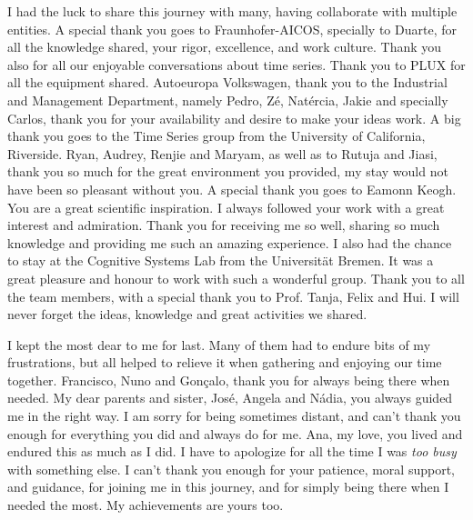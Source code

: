 \begin{ntacknowledgements}
I had the luck to share this journey with many, having collaborate with multiple entities. A special thank you goes to Fraunhofer-AICOS, specially to Duarte, for all the knowledge shared, your rigor, excellence, and work culture. Thank you also for all our enjoyable conversations about time series. Thank you to PLUX for all the equipment shared. Autoeuropa Volkswagen, thank you to the Industrial and Management Department, namely Pedro, Zé, Natércia, Jakie and specially Carlos, thank you for your availability and desire to make your ideas work. A big thank you goes to the Time Series group from the University of California, Riverside. Ryan, Audrey, Renjie and Maryam, as well as to Rutuja and Jiasi, thank you so much for the great environment you provided, my stay would not have been so pleasant without you. A special thank you goes to Eamonn Keogh. You are a great scientific inspiration. I always followed your work with a great interest and admiration. Thank you for receiving me so well, sharing so much knowledge and providing me such an amazing experience. I also had the chance to stay at the Cognitive Systems Lab from the Universität Bremen. It was a great pleasure and honour to work with such a wonderful group. Thank you to all the team members, with a special thank you to Prof. Tanja, Felix and Hui. I will never forget the ideas, knowledge and great activities we shared.

I kept the most dear to me for last. Many of them had to endure bits of my frustrations, but all helped to relieve it when gathering and enjoying our time together. Francisco, Nuno and Gonçalo, thank you for always being there when needed. My dear parents and sister, José, Angela and Nádia, you always guided me in the right way. I am sorry for being sometimes distant, and can't thank you enough for everything you did and always do for me. Ana, my love, you lived and endured this as much as I did. I have to apologize for all the time I was \textit{too busy} with something else. I can't thank you enough for your patience, moral support, and guidance, for joining me in this journey, and for simply being there when I needed the most. My achievements are yours too.

\end{ntacknowledgements}